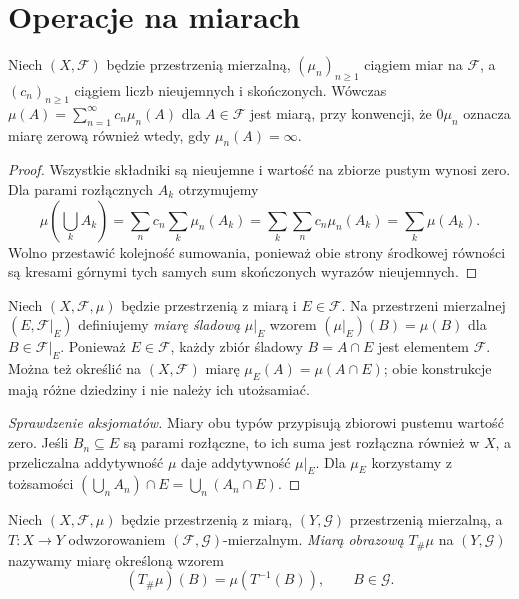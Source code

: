 \section{Operacje na miarach}

\begin{twierdzenie}
\label{thm:measure-operations}
Niech $(X,\mathcal F)$ będzie przestrzenią mierzalną,
$(\mu_n)_{n\geq1}$ ciągiem miar na $\mathcal F$,
a $(c_n)_{n\geq1}$ ciągiem liczb nieujemnych i skończonych.
Wówczas
$\mu(A)=\sum_{n=1}^{\infty}c_n\mu_n(A)$ dla $A\in\mathcal F$
jest miarą, przy konwencji, że $0\mu_n$ oznacza miarę
zerową również wtedy, gdy $\mu_n(A)=\infty$.
\end{twierdzenie}
\begin{proof}
Wszystkie składniki są nieujemne i wartość na zbiorze pustym
wynosi zero. Dla parami rozłącznych $A_k$ otrzymujemy
\[
\mu\left(\bigcup_kA_k\right)
=\sum_n c_n\sum_k\mu_n(A_k)
=\sum_k\sum_n c_n\mu_n(A_k)
=\sum_k\mu(A_k).
\]
Wolno przestawić kolejność sumowania, ponieważ obie strony
środkowej równości są kresami górnymi tych samych sum
skończonych wyrazów nieujemnych.
\end{proof}

\begin{definicja}
\label{def:restriction}
Niech $(X,\mathcal F,\mu)$ będzie przestrzenią z miarą
i $E\in\mathcal F$. Na przestrzeni mierzalnej
$(E,\mathcal F|_E)$ definiujemy \emph{miarę śladową}
$\mu|_E$ wzorem
$(\mu|_E)(B)=\mu(B)$ dla $B\in\mathcal F|_E$.
Ponieważ $E\in\mathcal F$, każdy zbiór śladowy
$B=A\cap E$ jest elementem $\mathcal F$.
Można też określić na $(X,\mathcal F)$ miarę
$\mu_E(A)=\mu(A\cap E)$; obie konstrukcje mają
różne dziedziny i nie należy ich utożsamiać.
\end{definicja}

\begin{proof}[Sprawdzenie aksjomatów]
Miary obu typów przypisują zbiorowi pustemu wartość zero.
Jeśli $B_n\subseteq E$ są parami rozłączne, to ich
suma jest rozłączna również w $X$, a przeliczalna
addytywność $\mu$ daje addytywność $\mu|_E$.
Dla $\mu_E$ korzystamy z tożsamości
$(\bigcup_nA_n)\cap E=\bigcup_n(A_n\cap E)$.
\end{proof}

\begin{definicja}
\label{def:pushforward}
Niech $(X,\mathcal F,\mu)$ będzie przestrzenią z miarą,
$(Y,\mathcal G)$ przestrzenią mierzalną, a
$T:X\to Y$ odwzorowaniem $(\mathcal F,\mathcal G)$-mierzalnym.
\emph{Miarą obrazową} $T_\#\mu$ na $(Y,\mathcal G)$ nazywamy
miarę określoną wzorem
\[
(T_\#\mu)(B)=\mu(T^{-1}(B)),\qquad B\in\mathcal G.
\]
\end{definicja}

